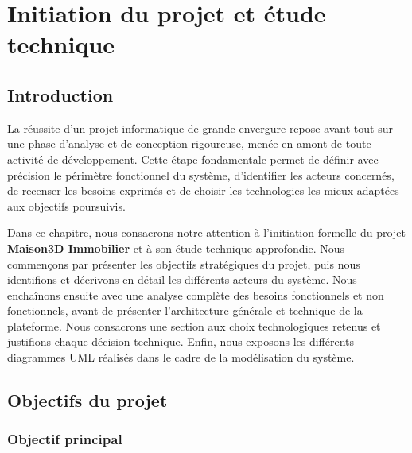 \documentclass[a4paper,12pt]{report}
\begin{document}

\chapter{Initiation du projet et étude technique}

\minitoc


\section{Introduction}

La réussite d'un projet informatique de grande envergure repose avant tout sur une phase d'analyse et de conception rigoureuse, menée en amont de toute activité de développement. Cette étape fondamentale permet de définir avec précision le périmètre fonctionnel du système, d'identifier les acteurs concernés, de recenser les besoins exprimés et de choisir les technologies les mieux adaptées aux objectifs poursuivis.

Dans ce chapitre, nous consacrons notre attention à l'initiation formelle du projet \textbf{Maison3D Immobilier} et à son étude technique approfondie. Nous commençons par présenter les objectifs stratégiques du projet, puis nous identifions et décrivons en détail les différents acteurs du système. Nous enchaînons ensuite avec une analyse complète des besoins fonctionnels et non fonctionnels, avant de présenter l'architecture générale et technique de la plateforme. Nous consacrons une section aux choix technologiques retenus et justifions chaque décision technique. Enfin, nous exposons les différents diagrammes UML réalisés dans le cadre de la modélisation du système.


\section{Objectifs du projet}

\subsection{Objectif principal}
\end{document}
